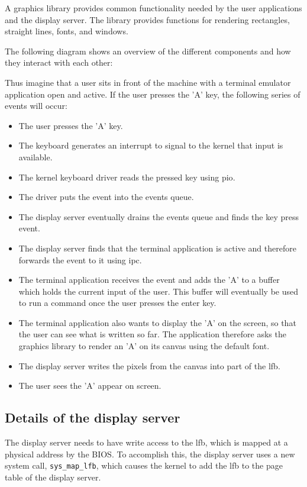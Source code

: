 \documentclass{article}
\begin{document}
A graphics library provides common functionality needed by the user
applications and the display server. The library provides functions for
rendering rectangles, straight lines, fonts, and windows.

The following diagram shows an overview of the different components and how
they interact with each other:


Thus imagine that a user sits in front of the machine with a terminal emulator
application open and active. If the user presses the 'A' key, the following
series of events will occur: 
\begin{itemize}
\item The user presses the 'A' key.
\item The keyboard generates an interrupt to signal to the kernel that input
is available.
\item The kernel keyboard driver reads the pressed key using \gls{pio}.
\item The driver puts the event into the events queue.
\item The display server eventually drains the events queue and finds the key
press event.
\item The display server finds that the terminal application is active and
therefore forwards the event to it using \gls{ipc}.
\item The terminal application receives the event and adds the 'A' to a buffer
which holds the current input of the user. This buffer will eventually be used
to run a command once the user presses the enter key.
\item The terminal application also wants to display the 'A' on the screen, so
that the user can see what is written so far. The application therefore asks
the graphics library to render an 'A' on its canvas using the default font.
\item The display server writes the pixels from the canvas into part of the
\gls{lfb}.
\item The user sees the 'A' appear on screen.
\end{itemize}



\subsection{Details of the display server}
The display server needs to have write access to the \gls{lfb}, which is
mapped at a physical address by the BIOS. To accomplish this, the display
server uses a new system call, \texttt{sys\_map\_lfb}, which causes the kernel
to add the \gls{lfb} to the page table of the display server.
\end{document}
